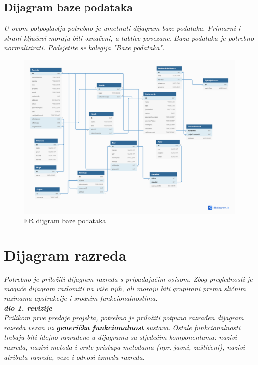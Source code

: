 				
			\newpage
			\subsection{Dijagram baze podataka}
				\textit{ U ovom potpoglavlju potrebno je umetnuti dijagram baze podataka. Primarni i strani ključevi moraju biti označeni, a tablice povezane. Bazu podataka je potrebno normalizirati. Podsjetite se kolegija "Baze podataka".}
				\begin{figure}[H]
					\includegraphics[scale=0.3]{dijagrami/ZK-ER-DIJAGRAM.png} 
					\centering
					\caption{ER dijgram baze podataka}
					\label{fig:ERdijagram}
				\end{figure}
			\eject
			
			
		\section{Dijagram razreda}
		
			\textit{Potrebno je priložiti dijagram razreda s pripadajućim opisom. Zbog preglednosti je moguće dijagram razlomiti na više njih, ali moraju biti grupirani prema sličnim razinama apstrakcije i srodnim funkcionalnostima.}\\
			
			\textbf{\textit{dio 1. revizije}}\\
			
			\textit{Prilikom prve predaje projekta, potrebno je priložiti potpuno razrađen dijagram razreda vezan uz \textbf{generičku funkcionalnost} sustava. Ostale funkcionalnosti trebaju biti idejno razrađene u dijagramu sa sljedećim komponentama: nazivi razreda, nazivi metoda i vrste pristupa metodama (npr. javni, zaštićeni), nazivi atributa razreda, veze i odnosi između razreda.}\\
			
